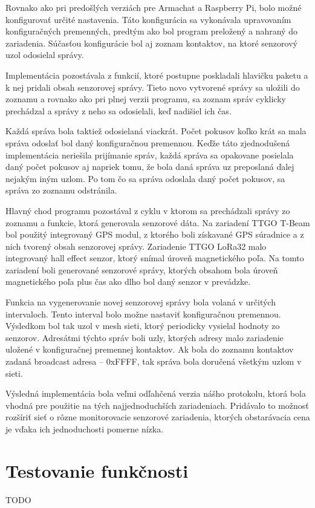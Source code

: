 \documentclass[slovak,master]{diploma}
\begin{document}
Rovnako ako pri predošlých verziách pre Armachat a Raspberry Pi, bolo možné konfigurovať určité nastavenia. Táto konfigurácia sa vykonávala upravovaním konfiguračných 
premenných, predtým ako bol program preložený a nahraný do zariadenia. Súčasťou konfigurácie bol aj zoznam kontaktov, na ktoré senzorový uzol odosielal správy.

Implementácia pozostávala z funkcií, ktoré postupne poskladali hlavičku paketu a k nej pridali obsah senzorovej správy. Tieto novo vytvorené správy sa uložili do zoznamu 
a rovnako ako pri plnej verzii programu, sa zoznam správ cyklicky prechádzal a správy z neho sa odosielali, keď nadišiel ich čas.

Každá správa bola taktiež odosielaná viackrát. Počet pokusov koľko krát sa mala správa odoslať bol daný konfiguračnou premennou. Keďže táto zjednodušená implementácia neriešila prijímanie správ, 
každá správa sa opakovane posielala daný počet pokusov aj napriek tomu, že bola daná správa uz preposlaná ďalej nejakým iným uzlom. Po tom čo sa správa odoslala 
daný počet pokusov, sa správa zo zoznamu odstránila.

Hlavný chod programu pozostával z cyklu v ktorom sa prechádzali správy zo zoznamu a funkcie, ktorá generovala senzorové dáta. Na zariadení TTGO T-Beam bol použitý integrovaný 
GPS modul, z ktorého boli získavané GPS súradnice a z nich tvorený obsah senzorovej správy. Zariadenie TTGO LoRa32 malo integrovaný hall effect senzor, ktorý snímal 
úroveň magnetického poľa. Na tomto zariadení boli generované senzorové správy, ktorých obsahom bola úroveň magnetického poľa plus čas ako dlho bol daný senzor v prevádzke.

Funkcia na vygenerovanie novej senzorovej správy bola volaná v určitých intervaloch. Tento interval bolo možne nastaviť konfiguračnou premennou. Výsledkom bol tak 
uzol v mesh sieti, ktorý periodicky vysielal hodnoty zo senzorov. Adresátmi týchto správ boli uzly, ktorých adresy malo zariadenie uložené v konfiguračnej premennej kontaktov. 
Ak bola do zoznamu kontaktov zadaná broadcast adresa -- 0xFFFF, tak správa bola doručená všetkým uzlom v sieti.

Výsledná implementácia bola veľmi odľahčená verzia nášho protokolu, ktorá bola vhodná pre použitie na tých najjednoduchších zariadeniach. Pridávalo to možnosť rozšíriť sieť 
o rôzne monitorovacie senzorové zariadenia, ktorých obstarávacia cena je vďaka ich jednoduchosti pomerne nízka.


\section{Testovanie funkčnosti}
TODO
\end{document}
